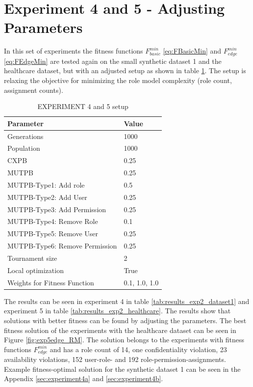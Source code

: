 \section{Experiment 4 and 5 - Adjusting Parameters}
\label{sec:phase3}
In this set of experiments the fitness functions $F_{basic}^{min}$ \eqref{eq:FBasicMin} and $F_{edge}^{min}$ \eqref{eq:FEdgeMin} are tested again on the small synthetic dataset 1 and the healthcare dataset, but with an adjusted setup as shown in table \ref{tab:setup3}. The setup is relaxing the objective for minimizing the role model complexity (role count, assignment counts).

\begin{table}[H]
    \centering
    \begin{tabular}{|l|l|}
        \hline
        \rowcolor{myGray} 
        \textbf{Parameter}              & \textbf{Value}    \\ \hline
        Generations                     & 1000              \\ \hline
        Population                      & 1000              \\ \hline
        CXPB                            & 0.25              \\ \hline
        MUTPB                           & 0.25              \\ \hline
        MUTPB-Type1: Add role           & 0.5               \\ \hline
        MUTPB-Type2: Add User           & 0.25              \\ \hline
        MUTPB-Type3: Add Permission     & 0.25              \\ \hline
        MUTPB-Type4: Remove Role        & 0.1               \\ \hline
        MUTPB-Type5: Remove User        & 0.25              \\ \hline
        MUTPB-Type6: Remove Permission  & 0.25              \\ \hline
        Tournament size                 & 2                 \\ \hline
        Local optimization              & True        		\\ \hline
        Weights for Fitness Function    & 0.1, 1.0, 1.0     \\ \hline
    \end{tabular}
    \caption{EXPERIMENT 4 and 5 setup}
    \label{tab:setup3}
\end{table}

The results can be seen in experiment 4 in table \ref{tab:results_exp2_dataset1} and experiment 5 in table \ref{tab:results_exp2_healthcare}. The results show that solutions with better fitness can be found by adjusting the parameters. The best fitness solution of the experiments with the healthcare dataset can be seen in Figure \ref{fig:exp5edge_RM}. The solution belongs to the experiments with fitness functions $F_{edge}^{min}$ and has a role count of 14, one confidentiality violation, 23 availability violations, 152 user-role- and 192 role-permission-assignments. Example fitness-optimal solution for the synthetic dataset 1 can be seen in the Appendix \ref{sec:experiment4a} and \ref{sec:experiment4b}.

